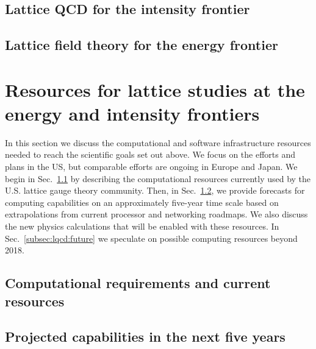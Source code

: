 

\subsection{Lattice QCD for the intensity frontier}
\label{subsec:lqcd:IF}



\subsection{Lattice field theory for the energy frontier}
\label{subsec:lqcd:EF}



\section{Resources for lattice studies at the energy and intensity frontiers}
\label{sec:lqcd:resources}

In this section we discuss the computational and software infrastructure resources needed to reach the scientific goals set out above.
We focus on the efforts and plans in the US, but comparable efforts are ongoing in Europe and Japan.  We begin in Sec.~\ref{subsec:lqcd:current} by describing the computational resources currently used by the U.S. lattice gauge theory community.  Then, in Sec.~\ref{subsec:lqcd:fiveyear}, we provide forecasts for computing capabilities on an approximately five-year time scale based on extrapolations from current processor and networking roadmaps.  We also discuss the new physics calculations that will be enabled with these resources.  In Sec.~\ref{subsec:lqcd:future} we speculate on possible computing resources beyond 2018.

\subsection{Computational requirements and current resources}
\label{subsec:lqcd:current}



\subsection{Projected capabilities in the next five years}
\label{subsec:lqcd:fiveyear}



